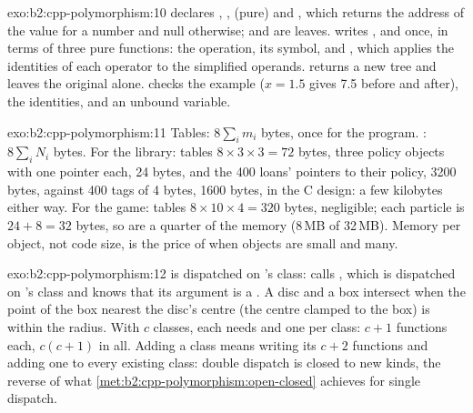 \begin{solution}{exo:b2:cpp-polymorphism:10}
 declares , ,  (pure) and , which returns the address of
the value for a number and null otherwise;  and  are leaves.  writes ,
 and  once, in terms of three pure functions: the operation, its symbol, and
, which applies the identities of each operator to the simplified operands.  returns a new
tree and leaves the original alone.  checks the example ($x = 1.5$ gives 7.5 before and
after), the identities, and an unbound variable.
\end{solution}

\begin{solution}{exo:b2:cpp-polymorphism:11}
Tables: $8 \sum_i m_i$ bytes, once for the program. : $8 \sum_i N_i$ bytes. For the library: tables
$8 \times 3 \times 3 = 72$ bytes, three policy objects with one pointer each, 24 bytes, and the 400 loans' pointers
to their policy, 3200 bytes, against 400 tags of 4 bytes, 1600 bytes, in the C design: a few kilobytes either way.
For the game: tables $8 \times 10 \times 4 = 320$ bytes, negligible; each particle is $24 + 8 = 32$ bytes, so  are a quarter of the memory (8\,MB of 32\,MB). Memory per object, not code size, is the price of  when objects are small and many.
\end{solution}

\begin{solution}{exo:b2:cpp-polymorphism:12}
 is dispatched on 's class:  calls , which is
dispatched on 's class and knows that its argument is a . A disc and a box intersect when the point
of the box nearest the disc's centre (the centre clamped to the box) is within the radius. With $c$ classes, each
needs  and one  per class: $c + 1$ functions each, $c(c+1)$ in all. Adding a class means
writing its $c + 2$ functions and adding one  to every existing class: double dispatch is closed to new
kinds, the reverse of what \cref{met:b2:cpp-polymorphism:open-closed} achieves for single dispatch.
\end{solution}

